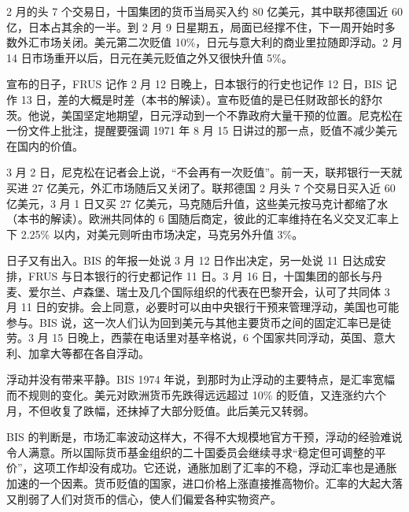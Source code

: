 2 月的头 7 个交易日，十国集团的货币当局买入约 80 亿美元，其中联邦德国近 60 亿，日本占其余的一半\cite{bis1973}。到 2 月 9 日星期五，局面已经撑不住，下一周开始时多数外汇市场关闭\cite{bis1973}。美元第二次贬值 10\%，日元与意大利的商业里拉随即浮动\cite{bis1973}。2 月 14 日市场重开以后，日元在美元贬值之外又很快升值 5\%\cite{bis1973}。

宣布的日子，FRUS 记作 2 月 12 日晚上，日本银行的行史也记作 12 日，BIS 记作 13 日，差的大概是时差（本书的解读）\cite{frus46b,boj1986,bis1973}。宣布贬值的是已任财政部长的舒尔茨\cite{frus46b}。他说，美国坚定地期望，日元浮动到一个不靠政府大量干预的位置\cite{frus46b}。尼克松在一份文件上批注，提醒要强调 1971 年 8 月 15 日讲过的那一点，贬值不减少美元在国内的价值\cite{frus46b}。

3 月 2 日，尼克松在记者会上说，“不会再有一次贬值”\cite{frus46b}。前一天，联邦银行一天就买进 27 亿美元，外汇市场随后又关闭了\cite{bis1973}。联邦德国 2 月头 7 个交易日买入近 60 亿美元，3 月 1 日又买 27 亿美元，马克随后升值，这些美元按马克计都缩了水（本书的解读）。欧洲共同体的 6 国随后商定，彼此的汇率维持在名义交叉汇率上下 2.25\% 以内，对美元则听由市场决定，马克另外升值 3\%\cite{bis1973}。

日子又有出入。BIS 的年报一处说 3 月 12 日作出决定，另一处说 11 日达成安排，FRUS 与日本银行的行史都记作 11 日\cite{bis1973,frus46b,boj1986}。3 月 16 日，十国集团的部长与丹麦、爱尔兰、卢森堡、瑞士及几个国际组织的代表在巴黎开会，认可了共同体 3 月 11 日的安排\cite{frus46b}。会上同意，必要时可以由中央银行干预来管理浮动，美国也可能参与\cite{bis1973}。BIS 说，这一次人们认为回到美元与其他主要货币之间的固定汇率已是徒劳\cite{bis1973}。3 月 15 日晚上，西蒙在电话里对基辛格说，6 个国家共同浮动，英国、意大利、加拿大等都在各自浮动\cite{frus46b}。

浮动并没有带来平静。BIS 1974 年说，到那时为止浮动的主要特点，是汇率宽幅而不规则的变化\cite{bis1974}。美元对欧洲货币先跌得远远超过 10\% 的贬值，又连涨约六个月，不但收复了跌幅，还抹掉了大部分贬值\cite{bis1974}。此后美元又转弱\cite{bis1974}。

BIS 的判断是，市场汇率波动这样大，不得不大规模地官方干预，浮动的经验难说令人满意\cite{bis1974}。所以国际货币基金组织的二十国委员会继续寻求“稳定但可调整的平价”，这项工作却没有成功\cite{bis1974}。它还说，通胀加剧了汇率的不稳，浮动汇率也是通胀加速的一个因素\cite{bis1974}。货币贬值的国家，进口价格上涨直接推高物价\cite{bis1974}。汇率的大起大落又削弱了人们对货币的信心，使人们偏爱各种实物资产\cite{bis1974}。

